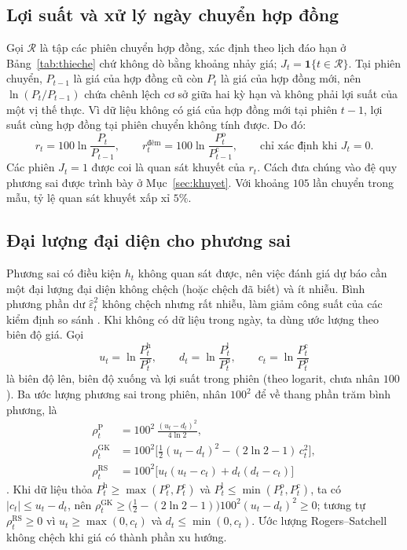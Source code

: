 \documentclass[12pt,a4paper]{article}
\theoremstyle{definition}
\theoremstyle{remark}
\newcommand{\ind}{\mathbf{1}}
\begin{document}
\subsection{Lợi suất và xử lý ngày chuyển hợp đồng}\label{sec:chuyenhd}

Gọi $\mathcal R$ là tập các phiên chuyển hợp đồng, xác định theo lịch đáo hạn ở Bảng~\ref{tab:thieche} chứ không dò bằng khoảng nhảy giá; $J_t=\ind\{t\in\mathcal R\}$. Tại phiên chuyển, $P_{t-1}$ là giá của hợp đồng cũ còn $P_t$ là giá của hợp đồng mới, nên $\ln(P_t/P_{t-1})$ chứa chênh lệch cơ sở giữa hai kỳ hạn và không phải lợi suất của một vị thế thực. Vì dữ liệu không có giá của hợp đồng mới tại phiên $t-1$, lợi suất cùng hợp đồng tại phiên chuyển không tính được. Do đó:
\begin{equation}\label{eq:loisuat}
r_t=100\ln\frac{P_t}{P_{t-1}},\qquad r^{\text{đêm}}_t=100\ln\frac{P^{\mathrm o}_t}{P^{\mathrm c}_{t-1}},\qquad\text{chỉ xác định khi } J_t=0.
\end{equation}
Các phiên $J_t=1$ được coi là quan sát khuyết của $r_t$. Cách đưa chúng vào đệ quy phương sai được trình bày ở Mục~\ref{sec:khuyet}. Với khoảng $105$ lần chuyển trong mẫu, tỷ lệ quan sát khuyết xấp xỉ $5\%$.

\subsection{Đại lượng đại diện cho phương sai}\label{sec:proxy}

Phương sai có điều kiện $h_t$ không quan sát được, nên việc đánh giá dự báo cần một đại lượng đại diện không chệch (hoặc chệch đã biết) và ít nhiễu. Bình phương phần dư $\hat\varepsilon_t^2$ không chệch nhưng rất nhiễu, làm giảm công suất của các kiểm định so sánh \cite{patton2011,hansenlunde2006}. Khi không có dữ liệu trong ngày, ta dùng ước lượng theo biên độ giá. Gọi
\begin{equation}
u_t=\ln\frac{P^{\mathrm h}_t}{P^{\mathrm o}_t},\qquad d_t=\ln\frac{P^{\mathrm l}_t}{P^{\mathrm o}_t},\qquad c_t=\ln\frac{P^{\mathrm c}_t}{P^{\mathrm o}_t}
\end{equation}
là biên độ lên, biên độ xuống và lợi suất trong phiên (theo logarit, chưa nhân $100$). Ba ước lượng phương sai trong phiên, nhân $100^2$ để về thang phần trăm bình phương, là
\begin{align}
\rho^{\mathrm P}_t&=100^2\,\frac{(u_t-d_t)^2}{4\ln 2}, \label{eq:park}\\
\rho^{\mathrm{GK}}_t&=100^2\Big[\tfrac12(u_t-d_t)^2-(2\ln2-1)\,c_t^2\Big], \label{eq:gk}\\
\rho^{\mathrm{RS}}_t&=100^2\big[u_t(u_t-c_t)+d_t(d_t-c_t)\big] \label{eq:rs}
\end{align}
\cite{parkinson1980,garmanklass1980,rogers1991}. Khi dữ liệu thỏa $P^{\mathrm h}_t\ge\max(P^{\mathrm o}_t,P^{\mathrm c}_t)$ và $P^{\mathrm l}_t\le\min(P^{\mathrm o}_t,P^{\mathrm c}_t)$, ta có $|c_t|\le u_t-d_t$, nên $\rho^{\mathrm{GK}}_t\ge\big(\tfrac12-(2\ln2-1)\big)100^2(u_t-d_t)^2\ge 0$; tương tự $\rho^{\mathrm{RS}}_t\ge0$ vì $u_t\ge\max(0,c_t)$ và $d_t\le\min(0,c_t)$. Ước lượng Rogers--Satchell không chệch khi giá có thành phần xu hướng.
\end{document}
